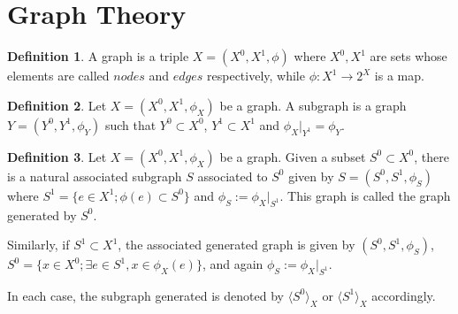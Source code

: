 \documentclass[]{article}
\theoremstyle{definition}
\newtheorem{definition}{Definition}[section]
\theoremstyle{definition}
\newcommand{\raw}{\rightarrow}
\begin{document}
\section{Graph Theory}

\begin{definition}
	A graph is a triple $X=(X^0, X^1, \phi)$ where $X^0, X^1$ are sets whose elements are called $nodes$ and $edges$ respectively, while $\phi:X^1 \raw 2^X$ is a map. 
\end{definition}

\begin{definition}
	Let $X=(X^0, X^1, \phi_X)$ be a graph. A subgraph is a graph $Y=(Y^0, Y^1, \phi_Y)$ such that $Y^0\subset X^0$, $Y^1\subset X^1$ and $\phi_X|_{Y^1}=\phi_Y$.
\end{definition}

\begin{definition}
	Let $X=(X^0, X^1, \phi_X)$ be a graph.	Given a subset $S^0 \subset X^0$, there is a natural associated subgraph $S$ associated to $S^0$ given by $S=(S^0, S^1, \phi_S)$ where $S^1=\{e \in X^1; \phi(e)\subset S^0 \}$ and $\phi_S := \phi_X|_{S^1}$. This graph is called the graph generated by $S^0$. 
	
	Similarly, if $S^1 \subset X^1$, the associated generated graph is given by $(S^0, S^1, \phi_S)$, $S^0=\{x \in X^0; \exists e \in S^1, x \in \phi_X(e)\}$, and again $\phi_S:=\phi_X|_{S^1}$.
	
	In each case, the subgraph generated is denoted by $\langle S^0 \rangle_X$ or $\langle S^1 \rangle_X$ accordingly.
\end{definition}
\end{document}
